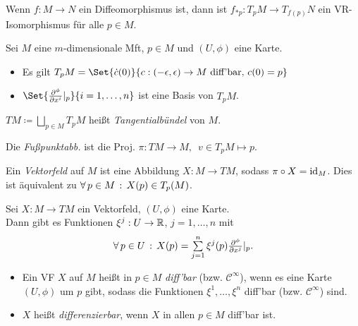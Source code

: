 \documentclass{cheat-sheet}
\newcommand{\coord}[1]{\tfrac{\partial^\phi}{\partial x^{#1}}} %
\newcommand{\Cont}{\mathcal{C}} %
\begin{document}
\begin{kor}
  Wenn $f : M \to N$ ein Diffeomorphismus ist, dann ist $f_{*p} : T_p M \to T_{f(p)} N$ ein VR-Isomorphismus für alle $p \in M$.
\end{kor}

\begin{satz}
  Sei $M$ eine $m$-dimensionale Mft, $p \in M$ und $(U, \phi)$ eine Karte.
  \begin{itemize}
    \item Es gilt $T_p M = \Set{ \dot{c}(0) }{ c : \ointerval{-\epsilon}{\epsilon} \to M \text{ diff'bar}, \, c(0) = p }$
    \item $\Set{\coord{i}|_p}{i=1, \ldots, n}$ ist eine Basis von $T_p M$.
  \end{itemize}
\end{satz}

\begin{defn}
  $TM \coloneqq \!\! \bigsqcup_{p \in M} \!\! T_p M$ heißt \emph{Tangentialbündel} von $M$.
\end{defn}


\begin{defn}
  Die \emph{Fußpunktabb.} ist die Proj.
  $\pi : TM \to M, \enspace v \in T_p M \mapsto p$.
\end{defn}

\begin{defn}
  Ein \emph{Vektorfeld} auf $M$ ist eine Abbildung $X : M \to TM$, sodass $\pi \circ X = \operatorname{id}_M$. Dies ist äquivalent zu $\forall \, {p \in M} \,:\, X(p) \in T_p(M)$.
\end{defn}

\begin{bem}
  Sei $X : M \to TM$ ein Vektorfeld, $(U, \phi)$ eine Karte. \\
  Dann gibt es Funktionen $\xi^j : U \to \mathbb{R}$, $j = 1, \ldots, n$ mit
  \[ \fa{p \in U} X(p) = \sum_{j=1}^n \xi^j(p) \coord{j}|_p. \]
\end{bem}

\begin{defn}
  \begin{itemize}
    \item Ein VF $X$ auf $M$ heißt in $p \in M$ \emph{diff'bar} (bzw. $\Cont^\infty$), wenn es eine Karte $(U, \phi)$ um $p$ gibt, sodass die Funktionen $\xi^1, \ldots, \xi^n$ diff'bar (bzw. $\Cont^\infty$) sind.
    \item $X$ heißt \emph{differenzierbar}, wenn $X$ in allen $p \in M$ diff'bar ist.
  \end{itemize}
\end{defn}
\end{document}
